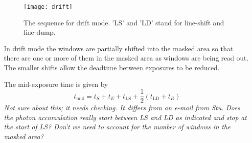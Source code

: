 \documentclass[12pt,a4paper]{article}
\begin{document}
\begin{figure}
\begin{center}
\texttt{[image: drift]}
\end{center}
\caption{\label{clear} The sequence for drift mode. 'LS' and 'LD' stand for
line-shift and line-dump.}
\end{figure}

In drift mode the windows are partially shifted into the masked area so that
there are one or more of them in the masked area as windows are being read
out. The smaller shifts allow the deadtime between exposures to be reduced.

%

The mid-exposure time is given by 
\begin{equation}
t_{\mathrm{mid}} = t_S + t_E + t_{\mathrm{LS}}
+\frac{1}{2} (t_{\mathrm{LD}} + t_R)
\end{equation}
\emph{Not sure about this; it needs checking. It differs
from an e-mail from Stu. Does the photon accumulation really start between
LS and LD as indicated and stop at the start of LS? Don't we need to account
for the number of windows in the masked area?}
\end{document}
